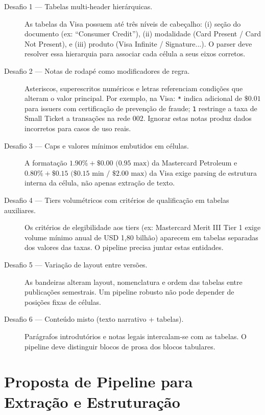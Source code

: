 \documentclass[12pt,a4paper]{article}
\begin{document}
\begin{description}
    \item[Desafio 1 --- Tabelas multi-header hierárquicas.] As tabelas da Visa possuem até três níveis de cabeçalho: (i) seção do documento (ex: ``Consumer Credit''), (ii) modalidade (Card Present / Card Not Present), e (iii) produto (Visa Infinite / Signature...). O parser deve resolver essa hierarquia para associar cada célula a seus eixos corretos.
    
    \item[Desafio 2 --- Notas de rodapé como modificadores de regra.] Asteriscos, superescritos numéricos e letras referenciam condições que alteram o valor principal. Por exemplo, na Visa: \texttt{*} indica adicional de $\$0.01$ para issuers com certificação de prevenção de fraude; \texttt{1} restringe a taxa de Small Ticket a transações na rede 002. Ignorar estas notas produz dados incorretos para casos de uso reais.
    
    \item[Desafio 3 --- Caps e valores mínimos embutidos em células.] A formatação $1.90\% + \$0.00 \text{ (0.95 max)}$ da Mastercard Petroleum e $0.80\% + \$0.15 \text{ (\$0.15 min / \$2.00 max)}$ da Visa exige parsing de estrutura interna da célula, não apenas extração de texto.
    
    \item[Desafio 4 --- Tiers volumétricos com critérios de qualificação em tabelas auxiliares.] Os critérios de elegibilidade aos tiers (ex: Mastercard Merit III Tier 1 exige volume mínimo anual de USD 1,80 bilhão) aparecem em tabelas separadas dos valores das taxas. O pipeline precisa juntar estas entidades.
    
    \item[Desafio 5 --- Variação de layout entre versões.] As bandeiras alteram layout, nomenclatura e ordem das tabelas entre publicações semestrais. Um pipeline robusto não pode depender de posições fixas de células.
    
    \item[Desafio 6 --- Conteúdo misto (texto narrativo + tabelas).] Parágrafos introdutórios e notas legais intercalam-se com as tabelas. O pipeline deve distinguir blocos de prosa dos blocos tabulares.
\end{description}

\newpage

\section{Proposta de Pipeline para Extração e Estruturação}
\end{document}
